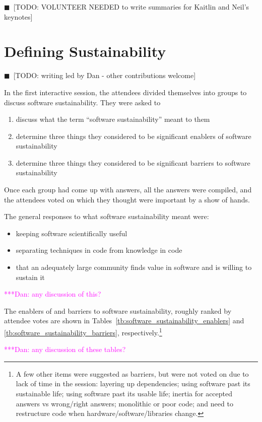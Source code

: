 \documentclass[11pt, oneside]{amsart}
\newcommand{\todo}[1]{{\color{blue}$\blacksquare$~\textsf{[TODO: #1]}}}
\newcommand{\katznote}[1]{ {\textcolor{magenta}    { ***Dan:      #1 }}}
\begin{document}
\todo{VOLUNTEER NEEDED to write summaries for Kaitlin and Neil's keynotes}

\section{Defining Sustainability}

\todo{writing led by Dan - other contributions welcome}

In the first interactive session, the attendees divided themselves into groups to discuss software sustainability.  They were asked to
\begin{enumerate}
\item discuss what the term ``software sustainability'' meant to them
\item determine three things they considered to be significant enablers of software sustainability
\item determine three things they considered to be significant barriers to software sustainability
\end{enumerate}
Once each group had come up with answers, all the answers were compiled, and the attendees voted on which they thought were important by a show of hands.

The general responses to what software sustainability meant were:

\begin{itemize}
\item keeping software scientifically useful
\item separating techniques in code from knowledge in code
\item that an adequately large community finds value in software and is willing to sustain it
\end{itemize}

\katznote{any discussion of this?}

The enablers of and barriers to software sustainability, roughly ranked by attendee votes are shown in Tables~\ref{tb:software_sustainability_enablers} and \ref{tb:software_sustainability_barriers}, respectively.\footnote{A few other items were suggested as barriers, but were not voted on due to lack of time in the session:
layering up dependencies;
using software past its sustainable life;
using software past its usable life;
inertia for accepted answers vs wrong/right answers;
monolithic or poor code; and
need to restructure code when hardware/software/libraries change.
}

\katznote{any discussion of these tables?}
\end{document}
